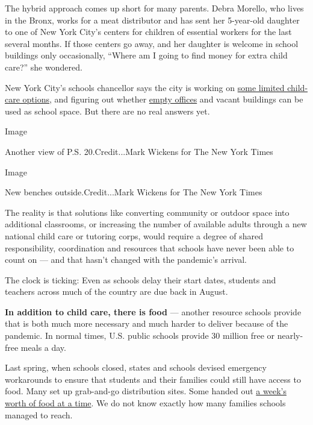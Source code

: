 The hybrid approach comes up short for many parents. Debra Morello, who
lives in the Bronx, works for a meat distributor and has sent her
5-year-old daughter to one of New York City's centers for children of
essential workers for the last several months. If those centers go away,
and her daughter is welcome in school buildings only occasionally,
``Where am I going to find money for extra child care?'' she wondered.

New York City's schools chancellor says the city is working on
\href{https://ny.chalkbeat.org/2020/7/16/21327364/nyc-vows-to-open-child-care-part-time-school}{some
limited child-care options}, and figuring out whether
\href{https://www.ny1.com/nyc/all-boroughs/education/2020/07/16/why-schools-chancellor-says-split-school-schedule-is-a-no-go-for-fall}{empty
offices} and vacant buildings can be used as school space. But there are
no real answers yet.

Image

Another view of P.S. 20.Credit...Mark Wickens for The New York Times

Image

New benches outside.Credit...Mark Wickens for The New York Times

The reality is that solutions like converting community or outdoor space
into additional classrooms, or increasing the number of available adults
through a new national child care or tutoring corps, would require a
degree of shared responsibility, coordination and resources that schools
have never been able to count on --- and that hasn't changed with the
pandemic's arrival.

The clock is ticking: Even as schools delay their start dates, students
and teachers across much of the country are due back in August.

\textbf{In addition to child care, there is food} --- another resource
schools provide that is both much more necessary and much harder to
deliver because of the pandemic. In normal times, U.S. public schools
provide 30 million free or nearly-free meals a day.

Last spring, when schools closed, states and schools devised emergency
workarounds to ensure that students and their families could still have
access to food. Many set up grab-and-go distribution sites. Some handed
out
\href{https://in.chalkbeat.org/2020/6/25/21303626/indianas-summer-food-program-expands-to-meet-increased-needs-during-the-coronavirus-covid19-pandemic}{a
week's worth of food at a time}. We do not know exactly how many
families schools managed to reach.

